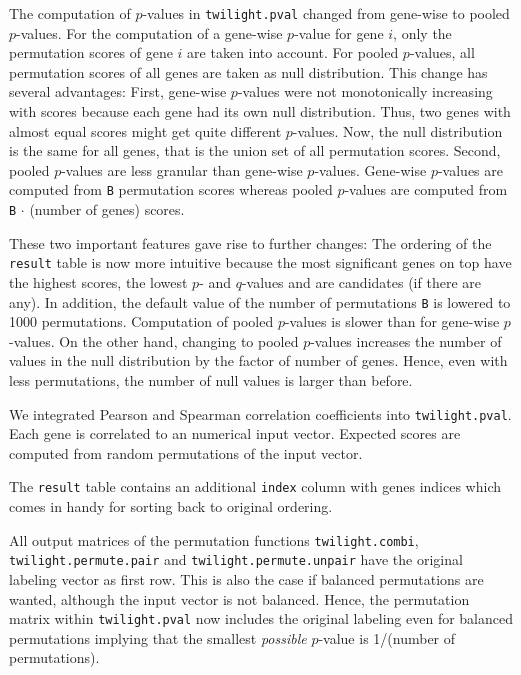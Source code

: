 \documentclass[11pt,a4paper,fleqn]{report}
\newcommand{\Robject}[1]{{\texttt{#1}}}
\newcommand{\Rfunction}[1]{{\texttt{#1}}}
\newcommand{\Rfunarg}[1]{{\texttt{#1}}}
\begin{document}
The computation of $p$-values in \Rfunction{twilight.pval} changed from gene-wise to pooled $p$-values. For the computation of a gene-wise $p$-value for gene $i$, only the permutation scores of gene $i$ are taken into account. For pooled $p$-values, all permutation scores of all genes are taken as null distribution. This change has several advantages: First, gene-wise $p$-values were not monotonically increasing with scores because each gene had its own null distribution. Thus, two genes with almost equal scores might get quite different $p$-values. Now, the null distribution is the same for all genes, that is the union set of all permutation scores. Second, pooled $p$-values are less granular than gene-wise $p$-values. Gene-wise $p$-values are computed from \Rfunarg{B} permutation scores whereas pooled $p$-values are computed from \Rfunarg{B} $\cdot$ (number of genes) scores.

These two important features gave rise to further changes: The ordering of the \Robject{result} table is now more intuitive because the most significant genes on top have the highest scores, the lowest $p$- and $q$-values and are candidates (if there are any). In addition, the default value of the number of permutations \Rfunarg{B} is lowered to 1000 permutations. Computation of pooled $p$-values is slower than for gene-wise $p$-values. On the other hand, changing to pooled $p$-values increases the number of values in the null distribution by the factor of number of genes. Hence, even with less permutations, the number of null values is larger than before.

We integrated Pearson and Spearman correlation coefficients into \Rfunction{twilight.pval}. Each gene is correlated to an numerical input vector. Expected scores are computed from random permutations of the input vector.
       
The \Robject{result} table contains an additional \Robject{index} column with genes indices which comes in handy for sorting back to original ordering.

All output matrices of the permutation functions \Rfunction{twilight.combi}, \Rfunction{twilight.permute.pair} and \Rfunction{twilight.permute.unpair} have the original labeling vector as first row. This is also the case if balanced permutations are wanted, although the input vector is not balanced. Hence, the permutation matrix within \Rfunction{twilight.pval} now includes the original labeling even for balanced permutations implying that the smallest \textit{possible} $p$-value is 1/(number of permutations).
\end{document}
